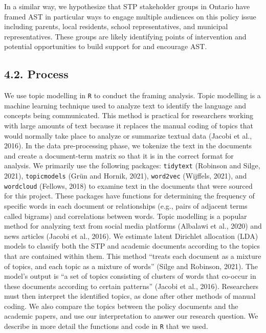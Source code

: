 \documentclass[]{elsarticle} %
\begin{document}
In a similar way, we hypothesize that STP stakeholder groups in Ontario
have framed AST in particular ways to engage multiple audiences on this
policy issue including parents, local residents, school representatives,
and municipal representatives. These groups are likely identifying
points of intervention and potential opportunities to build support for
and encourage AST.

\hypertarget{process}{%
\subsection{4.2. Process}\label{process}}

We use topic modelling in \texttt{R} to conduct the framing analysis.
Topic modelling is a machine learning technique used to analyze text to
identify the language and concepts being communicated. This method is
practical for researchers working with large amounts of text because it
replaces the manual coding of topics that would normally take place to
analyze or summarize textual data (Jacobi et al., 2016). In the data
pre-processing phase, we tokenize the text in the documents and create a
document-term matrix so that it is in the correct format for analysis.
We primarily use the following packages: \texttt{tidytext} (Robinson and
Silge, 2021), \texttt{topicmodels} (Grün and Hornik, 2021),
\texttt{word2vec} (Wijffels, 2021), and \texttt{wordcloud} (Fellows,
2018) to examine text in the documents that were sourced for this
project. These packages have functions for determining the frequency of
specific words in each document or relationships (e.g., pairs of
adjacent terms called bigrams) and correlations between words. Topic
modelling is a popular method for analyzing text from social media
platforms (Albalawi et al., 2020) and news articles (Jacobi et al.,
2016). We estimate latent Dirichlet allocation (LDA) models to classify
both the STP and academic documents according to the topics that are
contained within them. This method ``treats each document as a mixture
of topics, and each topic as a mixture of words'' (Silge and Robinson,
2021). The model's output is ``a set of topics consisting of clusters of
words that co-occur in these documents according to certain patterns''
(Jacobi et al., 2016). Researchers must then interpret the identified
topics, as done after other methods of manual coding. We also compare
the topics between the policy documents and the academic papers, and use
our interpretation to answer our research question. We describe in more
detail the functions and code in \texttt{R} that we used.
\end{document}
